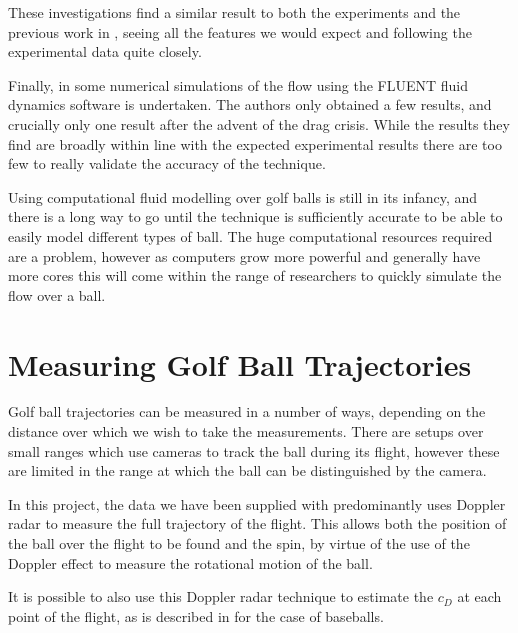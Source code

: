 These investigations find a similar result to both the experiments and the previous work in \citet{Smith2010},
seeing all the features we would expect and following the experimental data quite closely.

Finally, in \citet{Aoki2010} some numerical simulations of the flow using the FLUENT fluid dynamics
software is undertaken. The authors only obtained a few results, and crucially only one result after
the advent of the drag crisis. While the results they find are broadly within line with the expected
experimental results there are too few to really validate the accuracy of the technique.

Using computational fluid modelling over golf balls is still in its infancy, and there is a long way
to go until the technique is sufficiently accurate to be able to easily model different types of ball.
The huge computational resources required are a problem, however as computers grow more powerful and
generally have more cores this will come within the range of researchers to quickly simulate the flow
over a ball.
\section{Measuring Golf Ball Trajectories}

Golf ball trajectories can be measured in a number of ways, depending on the distance over which we
wish to take the measurements. There are setups over small ranges which use cameras to track the ball
during its flight, however these are limited in the range at which the ball can be distinguished by
the camera.

In this project, the data we have been supplied with predominantly uses Doppler radar to measure the
full trajectory of the flight. This allows both the position of the ball over the flight to be found
and the spin, by virtue of the use of the Doppler effect to measure the rotational motion of the ball.

It is possible to also use this Doppler radar technique to estimate the $c_D$ at each point of the 
flight, as is described in \citet{Martin2012} for the case of baseballs.